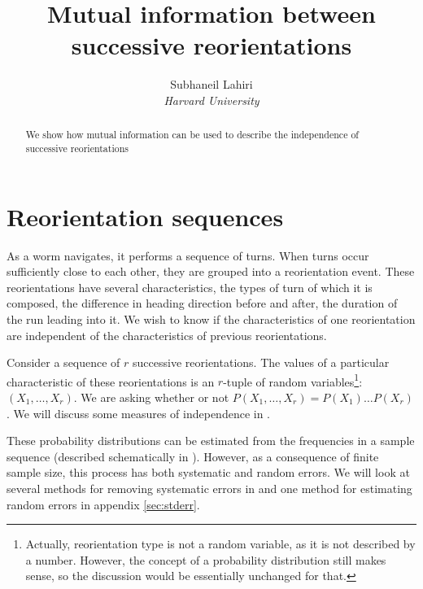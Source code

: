 \documentclass[12pt]{article}
\title{Mutual information between successive reorientations}
\author{Subhaneil Lahiri
\\
%
%
\small{\emph{Harvard University}}
%
}
\begin{document}
\maketitle





\begin{abstract}
  We show how mutual information can be used to describe the independence of successive reorientations
\end{abstract}



\section{Reorientation sequences}\label{sec:reoseq}

As a worm navigates, it performs a sequence of turns. When turns occur sufficiently close to each other, they are grouped into a reorientation event. These reorientations have several characteristics, \eg the types of turn of which it is composed, the difference in heading direction before and after, the duration of the run leading into it. We wish to know if the characteristics of one reorientation are independent of the characteristics of previous reorientations.

Consider a sequence of $r$ successive reorientations. The values of a particular characteristic of these reorientations is an $r$-tuple of random variables\footnote{ Actually, reorientation type is not a random variable, as it is not described by a number. However, the concept of a probability distribution still makes sense, so the discussion would be essentially unchanged for that. }: $(X_1,\ldots,X_r)$. We are asking whether or not $P(X_1,\ldots,X_r) = P(X_1)\ldots P(X_r)$. We will discuss some measures of independence in .

These probability distributions can be estimated from the frequencies in a sample sequence (described schematically in ). However, as a consequence of finite sample size, this process has both systematic and random errors. We will look at several methods for removing systematic errors in  and one method for estimating random errors in appendix \ref{sec:stderr}.
\end{document}
